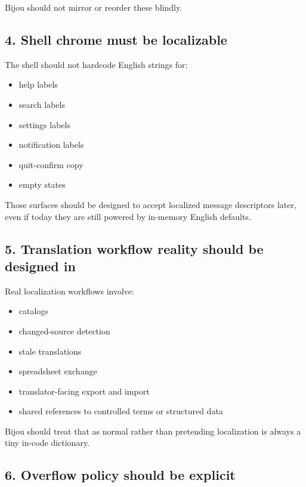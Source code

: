 Bijou should not mirror or reorder these blindly.

\subsection{4. Shell chrome must be localizable}\label{record-051-shell-chrome-must-be-localizable}

The shell should not hardcode English strings for:

\begin{itemize}
\tightlist
\item
  help labels
\item
  search labels
\item
  settings labels
\item
  notification labels
\item
  quit-confirm copy
\item
  empty states
\end{itemize}

Those surfaces should be designed to accept localized message descriptors later, even if today they are still powered by in-memory English defaults.

\subsection{5. Translation workflow reality should be designed in}\label{record-051-translation-workflow-reality-should-be-designed-in}

Real localization workflows involve:

\begin{itemize}
\tightlist
\item
  catalogs
\item
  changed-source detection
\item
  stale translations
\item
  spreadsheet exchange
\item
  translator-facing export and import
\item
  shared references to controlled terms or structured data
\end{itemize}

Bijou should treat that as normal rather than pretending localization is always a tiny in-code dictionary.

\subsection{6. Overflow policy should be explicit}\label{record-051-overflow-policy-should-be-explicit}

